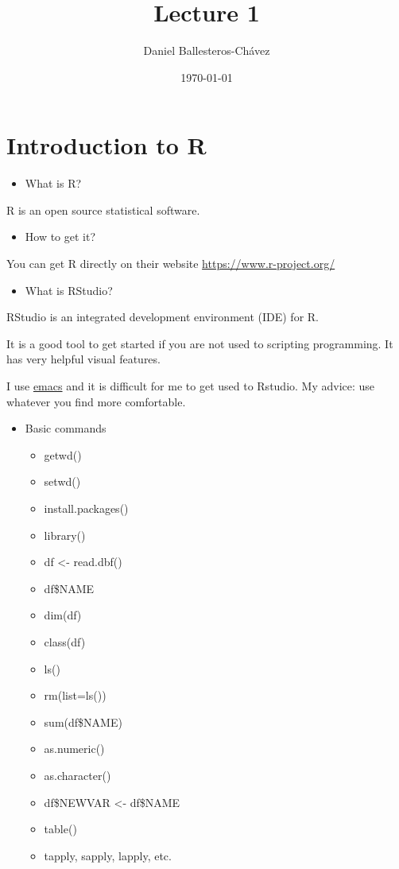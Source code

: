 \documentclass[11pt]{article}
\author{Daniel Ballesteros-Chávez}
\date{\today}
\title{Lecture 1}
\begin{document}
\maketitle
\tableofcontents


\section{Introduction to R}
\label{sec:orgfb2cae1}

\begin{itemize}
\item What is R?
\end{itemize}

R is an open source statistical software.

\begin{itemize}
\item How to get it?
\end{itemize}

You can get R directly on their website \url{https://www.r-project.org/}

\begin{itemize}
\item What is RStudio?
\end{itemize}

RStudio is an integrated development environment (IDE) for R. 

It is a good tool to get started if you are not used to scripting programming. It has very helpful visual features.

I use \href{https://www.gnu.org/software/emacs/}{emacs} and it is difficult for me to get used to Rstudio. My advice: use whatever you find more comfortable. 



\begin{itemize}
\item Basic commands
\begin{itemize}
\item getwd()
\item setwd()
\item install.packages()
\item library()
\item df <- read.dbf()
\item df\$NAME
\item dim(df)
\item class(df)
\item ls()
\item rm(list=ls())
\item sum(df\$NAME)
\item as.numeric()
\item as.character()
\item df\$NEWVAR <- df\$NAME
\item table()
\item tapply, sapply, lapply, etc.
\end{itemize}
\end{itemize}
\end{document}
